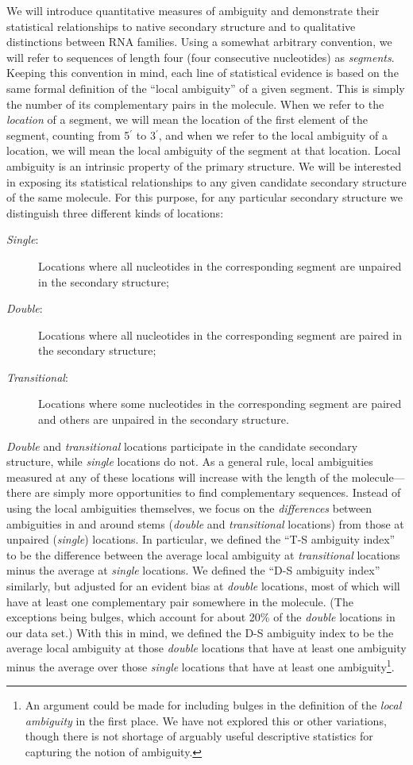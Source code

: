 \documentclass[10pt,letterpaper]{article}
\begin{document}
We will introduce quantitative measures of ambiguity and demonstrate their statistical relationships to native secondary structure and to qualitative distinctions between RNA families.
Using a somewhat arbitrary convention, we will
refer to sequences of length four (four consecutive nucleotides) as {\em segments}. Keeping this convention in mind, each line of statistical
evidence is based on the same formal definition of the ``local ambiguity'' of a given segment. This is simply the number of its complementary pairs in the molecule. 
When we refer to the {\em location} of a segment, we will mean the location of the first element of the segment, counting from 5$^\prime$ to 3$^\prime$, and  
when we refer to the local ambiguity of a location, we will mean the local ambiguity of the segment at that location. 
Local ambiguity is an intrinsic property of the primary structure. We will be interested in exposing its statistical relationships to any given candidate secondary structure of the same molecule. For this purpose, for any particular secondary structure we distinguish three different kinds of locations:
\begin{description}
	\item[\textit{Single}:] Locations where all nucleotides in the corresponding segment are unpaired in the secondary structure;
	\item[\textit{Double}:] Locations where all nucleotides in the corresponding segment are paired in the secondary structure;
	\item[\textit{Transitional}:] Locations where some nucleotides in the corresponding segment are paired and others are unpaired in the secondary structure.
\end{description}
{\em Double} and {\em transitional} locations participate in the candidate secondary structure, while {\em single} locations do not.
As a general rule, local ambiguities measured at any of these locations will increase with the length of the molecule---there are simply more opportunities to find complementary sequences.
Instead of using the local ambiguities themselves, we focus on the {\em differences} between ambiguities in and around stems ({\em double} and {\em transitional} locations) from those at unpaired ({\em single}) locations. In particular, we defined the ``T-S ambiguity index'' to be the difference between the average local ambiguity at {\em transitional} locations minus the average at {\em single} locations. We defined the ``D-S ambiguity index'' similarly, but adjusted for an evident bias at {\em double} locations, most of which will have at least one complementary pair somewhere in the molecule. 
(The exceptions being bulges, which account for about 20\% of the {\em double} locations in our data set.)
With this in mind, we defined the D-S ambiguity index to be the average local ambiguity at those {\em double} locations that have at least one ambiguity minus the average over those {\em single} locations that have at least one ambiguity\footnote{
An argument could be made for including bulges in the definition of the {\em local ambiguity} in the first place. We have not explored this or other variations, though there is not shortage of arguably useful descriptive statistics for capturing the notion of ambiguity.}.
\end{document}
